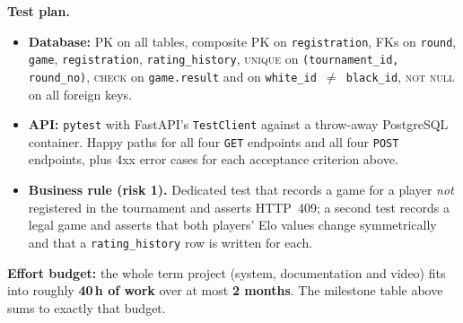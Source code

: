 \documentclass[11pt,a4paper]{article}
\begin{document}
\textbf{Test plan.}
\begin{itemize}[topsep=2pt]
  \item \textbf{Database:} PK on all tables, composite PK on
        \texttt{registration}, FKs on \texttt{round}, \texttt{game},
        \texttt{registration}, \texttt{rating\_history}, \textsc{unique} on
        \texttt{(tournament\_id, round\_no)}, \textsc{check} on
        \texttt{game.result} and on \texttt{white\_id $\neq$ black\_id},
        \textsc{not null} on all foreign keys.
  \item \textbf{API:} \texttt{pytest} with FastAPI's \texttt{TestClient}
        against a throw-away PostgreSQL container. Happy paths
        for all four \texttt{GET} endpoints and all four \texttt{POST}
        endpoints, plus 4xx error cases for each acceptance criterion above.
  \item \textbf{Business rule (risk 1).} Dedicated test that records a game
        for a player \emph{not} registered in the tournament and asserts
        HTTP~409; a second test records a legal game and asserts that both
        players' Elo values change symmetrically and that a
        \texttt{rating\_history} row is written for each.
\end{itemize}

\vspace{1em}
\begin{infobox}
\textbf{Effort budget:} the whole term project (system, documentation and video)
fits into roughly \textbf{40\,h of work} over at most \textbf{2 months}. The
milestone table above sums to exactly that budget.
\end{infobox}
\end{document}
